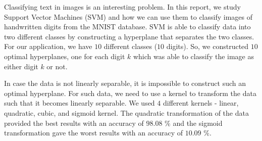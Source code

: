 
\noindent
{Classifying text in images is an interesting problem. In this report, we study Support Vector Machines (SVM)\cite{statistical-learning} and how we can use them to classify images of handwritten digits from the MNIST database\cite{mnist}. SVM is able to classify data into two different classes by constructing a hyperplane that separates the two classes. For our application, we have $10$ different classes ($10$ digits). So, we constructed $10$ optimal hyperplanes, one for each digit $k$ which was able to classify the image as either digit $k$ or not.}

\noindent
{In case the data is not linearly separable, it is impossible to construct such an optimal hyperplane. For such data, we need to use a kernel to transform the data such that it becomes linearly separable. We used $4$ different kernels - linear, quadratic, cubic, and sigmoid kernel. The quadratic transformation of the data provided the best results with an accuracy of $98.08$ \% and the sigmoid transformation gave the worst results with an accuracy of $10.09$ \%.}